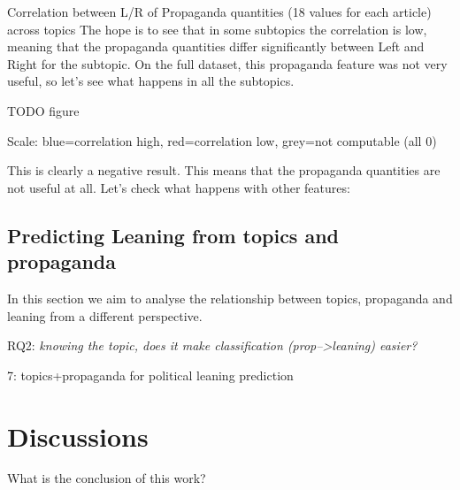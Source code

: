 Correlation between L/R of Propaganda quantities (18 values for each article) across topics
The hope is to see that in some subtopics the correlation is low, meaning that the propaganda quantities differ significantly between Left and Right for the subtopic.
On the full dataset, this propaganda feature was not very useful, so let’s see what happens in all the subtopics.

TODO figure

Scale: blue=correlation high, red=correlation low, grey=not computable (all 0)

This is clearly a negative result. This means that the propaganda quantities are not useful at all. Let’s check what happens with other features:



\subsection{Predicting Leaning from topics and propaganda}

In this section we aim to analyse the relationship between topics, propaganda and leaning from a different perspective.

RQ2: \emph{knowing the topic, does it make classification (prop-->leaning) easier?}

7: topics+propaganda for political leaning prediction


\section{Discussions}

What is the conclusion of this work?